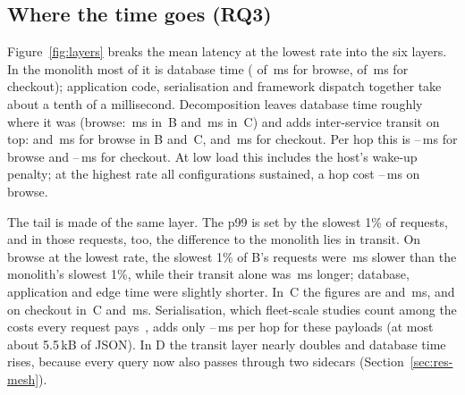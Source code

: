 

\subsection{Where the time goes (RQ3)}
\label{sec:res-layers}

Figure~\ref{fig:layers} breaks the mean latency at the lowest rate into the six layers. In the monolith most
of it is database time ( of \,ms for browse,
 of \,ms for checkout); application code, serialisation and
framework dispatch together take about a tenth of a millisecond. Decomposition leaves database time roughly where
it was (browse: \,ms in~B and \,ms in~C) and adds inter-service
transit on top:  and \,ms for browse in B and~C,
 and \,ms for checkout. Per hop this is
--\,ms for browse and --\,ms for checkout. At low load this includes the host's wake-up penalty; at the highest
rate all configurations sustained, a hop cost --\,ms on
browse.

The tail is made of the same layer. The p99 is set by the slowest 1\% of requests, and in those requests, too, the
difference to the monolith lies in transit. On browse at the lowest rate, the slowest 1\% of B's requests were
\,ms slower than the monolith's slowest 1\%, while their transit alone was
\,ms longer; database, application and edge time were slightly shorter. In~C the figures
are  and \,ms, and on checkout in~C 
and \,ms. Serialisation, which fleet-scale studies count among the costs every request pays~\cite{Kanev2015}, adds only
--\,ms per hop for these payloads (at most about 5.5\,kB of JSON).
In D the transit layer nearly doubles and database time rises, because every query now also passes
through two sidecars (Section~\ref{sec:res-mesh}).

